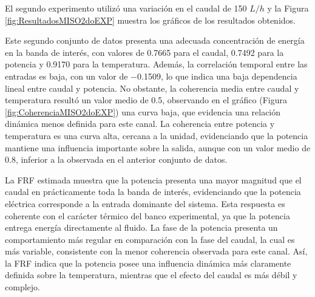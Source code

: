 \documentclass[11pt]{report}
\begin{document}
El segundo experimento utilizó una variación en el caudal de 150 $L/h$ y la Figura \ref{fig:ResultadosMISO2doEXP} muestra los gráficos de los resultados obtenidos. 

Este segundo conjunto de datos presenta una adecuada concentración de energía en la banda de interés, con valores de 0.7665 para el caudal, 0.7492 para la potencia y 0.9170 para la temperatura. Además, la correlación temporal entre las entradas es baja, con un valor de −0.1509, lo que indica una baja dependencia lineal entre caudal y potencia. No obstante, la coherencia media entre caudal y temperatura resultó un valor medio de 0.5, observando en el gráfico (Figura \ref{fig:CoherenciaMISO2doEXP}) una curva baja, que evidencia una relación dinámica menos definida para este canal. La coherencia entre potencia y temperatura es una curva alta, cercana a la unidad, evidenciando que la potencia mantiene una influencia importante sobre la salida, aunque con un valor medio de 0.8, inferior a la observada en el anterior conjunto de datos.

La FRF estimada muestra que la potencia presenta una mayor magnitud que el caudal en prácticamente toda la banda de interés, evidenciando que la potencia eléctrica corresponde a la entrada dominante del sistema. Esta respuesta es coherente con el carácter térmico del banco experimental, ya que la potencia entrega energía directamente al fluido. La fase de la potencia presenta un comportamiento más regular en comparación con la fase del caudal, la cual es más variable, consistente con la menor coherencia observada para este canal. Así, la FRF indica que la potencia posee una influencia dinámica más claramente definida sobre la temperatura, mientras que el efecto del caudal es más débil y complejo.
\end{document}
